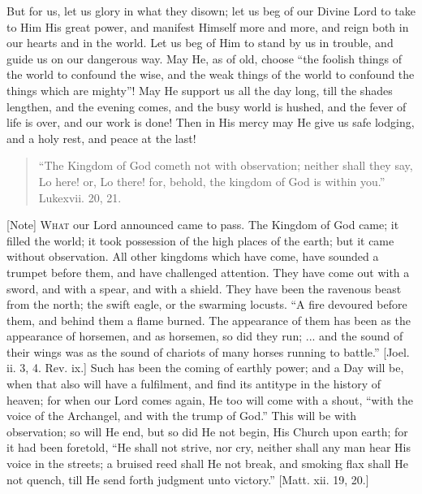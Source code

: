 But for us, let us glory in what they disown; let us beg of our
Divine Lord to take to Him His great power, and manifest Himself more
and more, and reign both in our hearts and in the world. Let us beg of
Him to stand by us in trouble, and guide us on our dangerous way. May
He, as of old, choose ``the foolish things of the world to
confound the wise, and the weak things of the world to confound the
things which are mighty''! May He support us all the day long,
till the shades lengthen, and the evening comes, and the busy world is
hushed, and the fever of life is over, and our work is done! Then in
His mercy may He give us safe lodging, and a holy rest, and peace at
the last!


\begin{quote}

``The Kingdom of God cometh not with observation; neither
shall they say, Lo here! or, Lo there! for, behold, the kingdom of
God is within you.'' Luke\textbf{}xvii. 20, 21.

\end{quote}

[Note] W\textsc{hat} our Lord announced
came to pass. The Kingdom of God came; it filled the world; it took
possession of the high places of the earth; but it came without
observation. All other kingdoms which have come, have sounded a
trumpet before them, and have challenged attention. They have come out
with a sword, and with a spear, and with a shield. They have been the
ravenous beast from the north; the swift eagle, or the swarming
locusts. ``A fire devoured before them, and behind them a flame
burned. The appearance of them has been as the appearance of horsemen,
and as horsemen, so did they run; ... and the sound of their wings was
as the sound of chariots of many horses running to battle.''
[Joel. ii. 3, 4. Rev. ix.] Such has been the coming of earthly power;
and a Day will be, when that also will have a fulfilment, and find its
antitype in the history of heaven; for when our Lord comes again, He
too will come with a shout, ``with the voice of the Archangel, and
with the trump of God.'' This will be with observation; so will He
end, but so did He not begin, His Church upon earth; for it had been
foretold, ``He shall not strive, nor cry, neither shall any man
hear His voice in the streets; a bruised reed shall He not break, and
smoking flax shall He not quench, till He send forth judgment unto
victory.'' [Matt. xii. 19, 20.]

